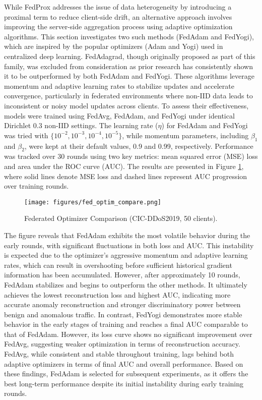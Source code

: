 While FedProx addresses the issue of data heterogeneity by introducing a proximal term to reduce client-side drift, an alternative approach involves improving the server-side aggregation process using adaptive optimization algorithms. This section investigates two such methods (FedAdam and FedYogi), which are inspired by the popular optimizers (Adam and Yogi) used in centralized deep learning. FedAdagrad, though originally proposed as part of this family, was excluded from consideration as prior research has consistently shown it to be outperformed by both FedAdam and FedYogi. These algorithms leverage momentum and adaptive learning rates to stabilize updates and accelerate convergence, particularly in federated environments where non-IID data leads to inconsistent or noisy model updates across clients. To assess their effectiveness, models were trained using FedAvg, FedAdam, and FedYogi under identical Dirichlet 0.3 non-IID settings. The learning rate ($\eta$) for FedAdam and FedYogi was tried with $\{10^{-2}, 10^{-3}, 10^{-4}, 10^{-5}\}$, while momentum parameters, including $\beta_1$ and $\beta_2$, were kept at their default values, 0.9 and 0.99, respectively. Performance was tracked over 30 rounds using two key metrics: mean squared error (MSE) loss and area under the ROC curve (AUC). The results are presented in Figure \ref{fig:fed_optim_compare}, where solid lines denote MSE loss and dashed lines represent AUC progression over training rounds.

\begin{figure}[h]
    \centering
    \texttt{[image: figures/fed\_optim\_compare.png]}
    \caption{Federated Optimizer Comparison (CIC-DDoS2019, 50 clients).}
    \label{fig:fed_optim_compare}
\end{figure}

The figure reveals that FedAdam exhibits the most volatile behavior during the early rounds, with significant fluctuations in both loss and AUC. This instability is expected due to the optimizer’s aggressive momentum and adaptive learning rates, which can result in overshooting before sufficient historical gradient information has been accumulated. However, after approximately 10 rounds, FedAdam stabilizes and begins to outperform the other methods. It ultimately achieves the lowest reconstruction loss and highest AUC, indicating more accurate anomaly reconstruction and stronger discriminatory power between benign and anomalous traffic. In contrast, FedYogi demonstrates more stable behavior in the early stages of training and reaches a final AUC comparable to that of FedAdam. However, its loss curve shows no significant improvement over FedAvg, suggesting weaker optimization in terms of reconstruction accuracy. FedAvg, while consistent and stable throughout training, lags behind both adaptive optimizers in terms of final AUC and overall performance. Based on these findings, FedAdam is selected for subsequent experiments, as it offers the best long-term performance despite its initial instability during early training rounds.

